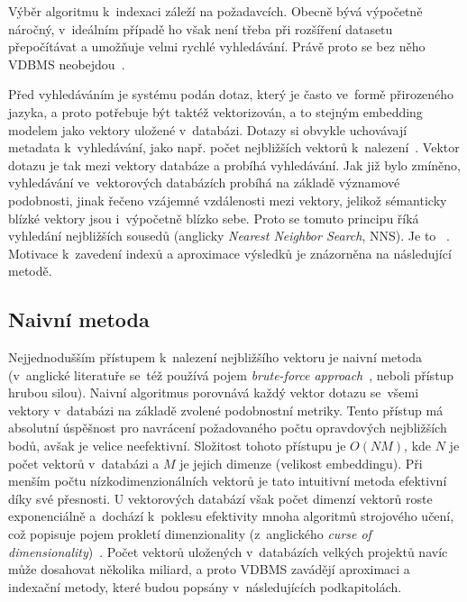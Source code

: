 Výběr algoritmu k~indexaci záleží na požadavcích. Obecně bývá výpočetně náročný, v~ideálním případě ho však není třeba při rozšíření datasetu přepočítávat a umožňuje velmi rychlé vyhledávání. Právě proto se bez něho VDBMS neobejdou~\cite{Taipalus_2024}.

Před vyhledáváním je systému podán dotaz, který je často ve~formě přirozeného jazyka, a proto potřebuje být taktéž vektorizován, a to stejným embedding modelem jako vektory uložené v~databázi. Dotazy si obvykle uchovávají metadata k~vyhledávání, jako např. počet nejbližších vektorů k~nalezení~\cite{Taipalus_2024}. Vektor dotazu je tak  mezi vektory databáze a probíhá vyhledávání. Jak již bylo zmíněno, vyhledávání ve~vektorových databázích probíhá na základě významové podobnosti, jinak řečeno vzájemné vzdálenosti mezi vektory, jelikož sémanticky blízké vektory jsou i~výpočetně blízko sebe. Proto se tomuto principu říká vyhledání nejbližších sousedů (anglicky \textit{Nearest Neighbor Search}, NNS). Je to ~\cite{han2023_vector_database}. Motivace k~zavedení indexů a aproximace výsledků je znázorněna na následující metodě.

\subsection{Naivní metoda}
Nejjednodušším přístupem k~nalezení nejbližšího vektoru je naivní metoda (v~anglické literatuře se~též používá pojem \textit{brute-force approach}~\cite{han2023_vector_database}, neboli přístup hrubou silou).
Naivní algoritmus porovnává každý vektor dotazu se~všemi vektory v~databázi na základě zvolené podobnostní metriky. Tento přístup má absolutní úspěšnost pro navrácení požadovaného počtu opravdových nejbližších bodů, avšak je velice neefektivní. Složitost tohoto přístupu je $O(NM)$, kde $N$ je počet vektorů v~databázi a $M$ je jejich dimenze (velikost embeddingu). Při menším počtu nízkodimenzionálních vektorů je tato intuitivní metoda efektivní díky své přesnosti. U vektorových databází však počet dimenzí vektorů roste exponenciálně a~dochází k~poklesu efektivity mnoha algoritmů strojového učení, což popisuje pojem prokletí dimenzionality (z~anglického \textit{curse of dimensionality})~\cite{peng2024_curse_dimensionality}. Počet vektorů uložených v~databázích velkých projektů navíc může dosahovat několika miliard, a proto VDBMS zavádějí aproximaci a indexační metody, které budou popsány v~následujících podkapitolách.

